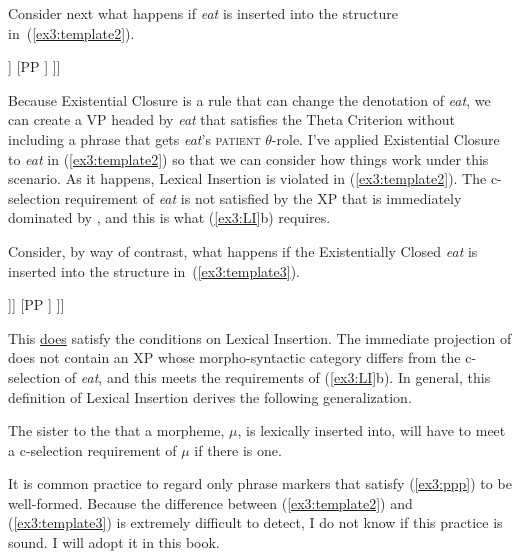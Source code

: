 Consider next what happens if \emph{eat} is inserted into the structure in~(\ref{ex3:template2}).
\begin{exe}
	\raggedright
	\ex \label{ex3:template2} 
	\small
	\begin{forest}
	[VP[\ibar{V}
		[$\lambda \epsilon$ $\exists x$ \textsc{patient}($x$)($\epsilon$) $\wedge$ \textsc{eat}($\epsilon$)\\ \obar{V} [eat]]
		[PP ]
	]]
	\end{forest}
\end{exe}
Because Existential Closure is a rule that can change the denotation of \emph{eat}, we can create a VP headed by \emph{eat} that satisfies the Theta Criterion without including a phrase that gets \emph{eat}'s \textsc{patient} $\theta$-role. I've applied Existential Closure to \emph{eat} in (\ref{ex3:template2}) so that we can consider how things work under this scenario. As it happens, Lexical Insertion is violated in (\ref{ex3:template2}). The c-selection requirement of \emph{eat} is not satisfied by the XP that is immediately dominated by , and this is what (\ref{ex3:LI}b) requires.

Consider, by way of contrast, what happens if the Existentially Closed \emph{eat} is inserted into the structure in~(\ref{ex3:template3}).
\begin{exe}
	\raggedright
	\ex \label{ex3:template3} 
	\small
	\begin{forest}
	[VP[\ibar{V}
		[$\lambda \epsilon$ $\exists x$ \textsc{patient}($x$)($\epsilon$) $\wedge$ \textsc{eat}($\epsilon$)\\ \ibar{V} [$\lambda \epsilon$ $\exists x$ \textsc{patient}($x$)($\epsilon$) $\wedge$ \textsc{eat}($\epsilon$)\\\obar{V} [eat]]]
		[PP ]
	]]
	\end{forest}
\end{exe}
This \underline{does} satisfy the conditions on Lexical Insertion. The immediate projection of  does not contain an XP whose morpho-syntactic category differs from the c-selection of \emph{eat}, and this meets the requirements of (\ref{ex3:LI}b). In general, this definition of Lexical Insertion derives the following generalization.
\begin{exe}
	\raggedright
	\ex \label{ex3:ppp} 
	The sister to the  that a morpheme, $\mu$, is lexically inserted into, will have to meet a c-selection requirement of $\mu$ if there is one.
\end{exe}
It is common practice to regard only phrase markers that satisfy (\ref{ex3:ppp}) to be well-formed. Because the difference between (\ref{ex3:template2}) and (\ref{ex3:template3}) is extremely difficult to detect, I do not know if this practice is sound. I will adopt it in this book.

